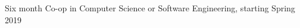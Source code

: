 

\begin{cvparagraph}

Six month Co-op in Computer Science or Software Engineering, starting Spring 2019
\end{cvparagraph}
